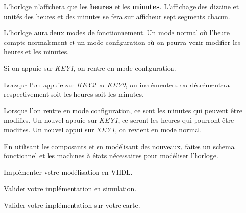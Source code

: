 L'horloge n'affichera que les \textbf{heures} et les \textbf{minutes}. L'affichage des dizaine et unités des heures et des minutes se fera sur afficheur sept segments chacun.

\medskip

L'horloge aura deux modes de fonctionnement. Un mode normal où l'heure compte normalement et un mode configuration où on pourra venir modifier les heures et les minutes.

\medskip
Si on appuie sur \textit{KEY1}, on rentre en mode configuration.

\medskip 

Lorsque l'on appuie sur \textit{KEY2} ou \textit{KEY0}, on incrémentera ou décrémentera respectivement soit les heures soit les minutes.

\medskip

Lorsque l'on rentre en mode configuration, ce sont les minutes qui peuvent être modifies. Un nouvel appuie sur \textit{KEY1}, ce seront les heures qui pourront être modifies. Un nouvel appui sur \textit{KEY1}, on revient en mode normal.

\medskip

En utilisant les composants et en modélisant des nouveaux, faites un schema fonctionnel et les machines à états nécessaires pour modéliser l'horloge.

\medskip

Implémenter votre modélisation en VHDL.

\medskip

Valider votre implémentation en simulation.

\medskip

Valider votre implémentation sur votre carte.